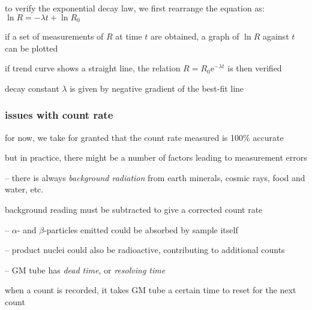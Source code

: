 \begin{wrapfigure}{r}{0.45\textwidth}
	\vspace*{-8pt}
	\centering
	\vspace*{-12pt}
\end{wrapfigure}

to verify the exponential decay law, we first rearrange the equation as: $\ln R = -\lambda t + \ln R_0$

if a set of measurements of $R$ at time $t$ are obtained, a graph of $\ln R$ against $t$ can be plotted

if trend curve shows a straight line, the relation $R=R_0\mathrm{e}^{-\lambda t}$ is then verified

decay constant $\lambda$ is given by negative gradient of the best-fit line

\subsubsection*{issues with count rate}

for now, we take for granted that the count rate measured is 100\% accurate

but in practice, there might be a number of factors leading to measurement errors

\begin{compactenum}
	\item[--] there is always \emph{background radiation} from earth minerals, cosmic rays, food and water, etc.
	
	background reading must be subtracted to give a corrected count rate
	
	\item[--] $\alpha$- and $\beta$-particles emitted could be absorbed by sample itself
	
	\item[--] product nuclei could also be radioactive, contributing to additional counts
	
	\item[--] GM tube has \emph{dead time}, or \emph{resolving time}
	
	when a count is recorded, it takes GM tube a certain time
	to reset for the next count
\end{compactenum}


